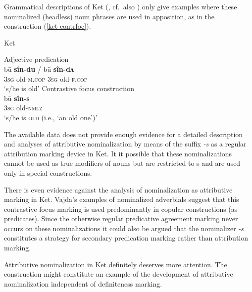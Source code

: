Grammatical descriptions of Ket (\citealt{vajda2004}, cf.~also \citealt{krukova2007}) only give examples where these nominalized (headless) noun phrases are used in apposition, as in the  construction (\ref{ket contrfoc}). 
\begin{exe}
\ex 
\label{ket contrfoc}
{\rm Ket \citep{vajda2005}} 
\begin{xlist}
\ex	
{\rm Adjective predication}\\
\gll	bū \textbf{sîn-du} / bū \textbf{sîn-dʌ}\\
	3\textsc{sg} old-\textsc{m.cop} { } 3\textsc{sg} old-\textsc{f.cop}\\
\glt	‘s/he is old’
\ex	
{\rm Contrastive focus construction}\\
\gll	bū \textbf{sîn-s}\\
	3\textsc{sg} old-\textsc{nmlz}\\
\glt	‘s/he is \textsc{old} (i.e., ‘an old one’)’
\end{xlist}
\end{exe}
The available data does not provide enough evidence for a detailed description and analyses of attributive nominalization by means of the suffix \textit{-s} as a regular attribution marking device in Ket. It it possible that these nominalizations cannot be used as true modifiers of nouns but are restricted to s and are used only in special  constructions.

There is even evidence against the analysis of nominalization as attributive marking in Ket. Vajda's examples of nominalized adverbials suggest that this contrastive focus marking is used predominantly in copular constructions (as predicates). Since the otherwise regular predicative agreement marking never occurs on these nominalizations \citep[15]{vajda2004} it could also be argued that the nominalizer \textit{-s} constitutes a strategy for secondary predication marking rather than attribution marking.

Attributive nominalization in Ket definitely deserves more attention. The construction might constitute an example of the development of attributive nominalization independent of definiteness marking.

